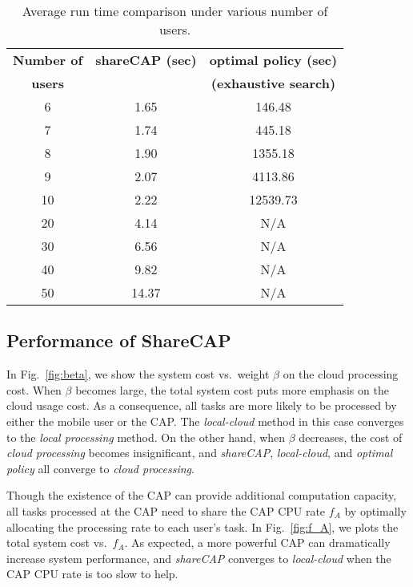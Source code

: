 \documentclass[10pt,journal,compsoc]{IEEEtran}
\begin{document}
{\begin{table}[t]
\caption{Average run time comparison under various number of users.}
\centering
\begin{tabular}{|c| c|c|}
\hline %
\textbf{Number of} & \textbf{shareCAP (sec)}& \textbf{optimal policy (sec)}\\ \textbf{users} &  &  \textbf{(exhaustive search)}\\
\hline %
6 & 1.65  & 146.48 \\\hline
7 & 1.74  & 445.18 \\\hline
8 & 1.90  & 1355.18 \\\hline
9 & 2.07  & 4113.86 \\\hline
10 & 2.22  & 12539.73 \\\hline
20 & 4.14  & N/A\\\hline
30 & 6.56  & N/A\\\hline
40 & 9.82  & N/A\\\hline
50 & 14.37  & N/A\\
 \hline
\end{tabular}\vspace{-0.2cm}
\label{table_run time}
\end{table}


\subsection{Performance of ShareCAP}
In Fig.~\ref{fig:beta}, we show the system cost vs.~weight $\beta$
on the cloud processing cost. When $\beta$ becomes large, the total
system cost puts more emphasis on the cloud usage cost. As a
consequence, all tasks are more likely to be processed by either the
mobile user or the CAP. The \textit{local-cloud} method in this case
converges to the \textit{local processing} method. On the other
hand, when $\beta$ decreases, the cost of \textit{cloud processing}
becomes insignificant, and \textit{shareCAP}, \textit{local-cloud},
and \textit{optimal policy} all converge to \textit{cloud
processing}.

Though the existence of the CAP can provide additional computation
capacity, all tasks processed at the CAP need to share the CAP CPU
rate $f_A$ by optimally allocating the processing rate to each
user's task. In Fig.~\ref{fig:f_A}, we plots the total system cost
vs.~$f_A$. As expected, a more powerful CAP can dramatically
increase system performance, and \textit{shareCAP} converges to
\textit{local-cloud} when the CAP CPU rate is too slow to help.


}
\end{document}
